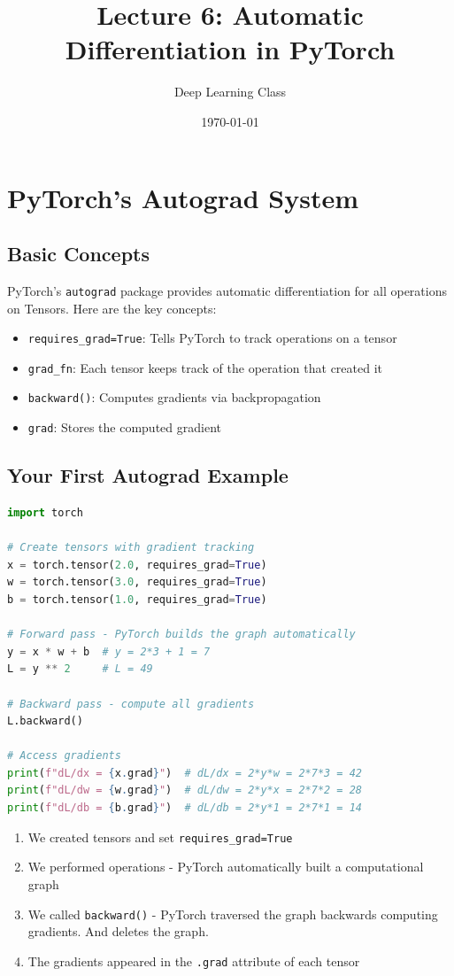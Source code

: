 \documentclass{article}
\title{Lecture 6: Automatic Differentiation in PyTorch}
\author{Deep Learning Class}
\date{\today}
\begin{document}
\section{PyTorch's Autograd System}

\subsection{Basic Concepts}

PyTorch's \texttt{autograd} package provides automatic differentiation for all operations on Tensors. Here are the key concepts:

\begin{itemize}
    \item \texttt{requires\_grad=True}: Tells PyTorch to track operations on a tensor
    \item \texttt{grad\_fn}: Each tensor keeps track of the operation that created it
    \item \texttt{backward()}: Computes gradients via backpropagation
    \item \texttt{grad}: Stores the computed gradient
\end{itemize}

\subsection{Your First Autograd Example}

\begin{lstlisting}[language=Python]
import torch

# Create tensors with gradient tracking
x = torch.tensor(2.0, requires_grad=True)
w = torch.tensor(3.0, requires_grad=True)
b = torch.tensor(1.0, requires_grad=True)

# Forward pass - PyTorch builds the graph automatically
y = x * w + b  # y = 2*3 + 1 = 7
L = y ** 2     # L = 49

# Backward pass - compute all gradients
L.backward()

# Access gradients
print(f"dL/dx = {x.grad}")  # dL/dx = 2*y*w = 2*7*3 = 42
print(f"dL/dw = {w.grad}")  # dL/dw = 2*y*x = 2*7*2 = 28
print(f"dL/db = {b.grad}")  # dL/db = 2*y*1 = 2*7*1 = 14
\end{lstlisting}

\begin{tcolorbox}[colback=yellow!5!white, colframe=orange!50!black, title=What Just Happened?]
\begin{enumerate}
    \item We created tensors and set \texttt{requires\_grad=True}
    \item We performed operations - PyTorch automatically built a computational graph
    \item We called \texttt{backward()} - PyTorch traversed the graph backwards computing gradients. And deletes the graph.
    \item The gradients appeared in the \texttt{.grad} attribute of each tensor
\end{enumerate}

\end{tcolorbox}
\end{document}
